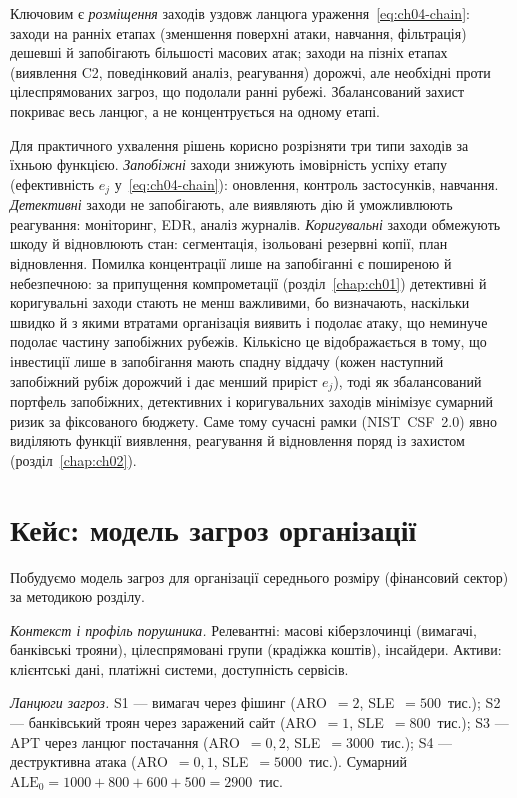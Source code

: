 Ключовим є \emph{розміщення} заходів уздовж ланцюга ураження~\eqref{eq:ch04-chain}: заходи на ранніх етапах (зменшення поверхні атаки, навчання, фільтрація) дешевші й запобігають більшості масових атак; заходи на пізніх етапах (виявлення C2, поведінковий аналіз, реагування) дорожчі, але необхідні проти цілеспрямованих загроз, що подолали ранні рубежі. Збалансований захист покриває весь ланцюг, а не концентрується на одному етапі.

Для практичного ухвалення рішень корисно розрізняти три типи заходів за їхньою функцією. \emph{Запобіжні} заходи знижують імовірність успіху етапу (ефективність $e_j$ у~\eqref{eq:ch04-chain}): оновлення, контроль застосунків, навчання. \emph{Детективні} заходи не запобігають, але виявляють дію й уможливлюють реагування: моніторинг, EDR, аналіз журналів. \emph{Коригувальні} заходи обмежують шкоду й відновлюють стан: сегментація, ізольовані резервні копії, план відновлення. Помилка концентрації лише на запобіганні є поширеною й небезпечною: за припущення компрометації (розділ~\ref{chap:ch01}) детективні й коригувальні заходи стають не менш важливими, бо визначають, наскільки швидко й з якими втратами організація виявить і подолає атаку, що неминуче подолає частину запобіжних рубежів. Кількісно це відображається в тому, що інвестиції лише в запобігання мають спадну віддачу (кожен наступний запобіжний рубіж дорожчий і дає менший приріст $e_j$), тоді як збалансований портфель запобіжних, детективних і коригувальних заходів мінімізує сумарний ризик за фіксованого бюджету. Саме тому сучасні рамки (NIST~CSF~2.0) явно виділяють функції виявлення, реагування й відновлення поряд із захистом (розділ~\ref{chap:ch02}).

\section{Кейс: модель загроз організації}\label{sec:ch04-case}

Побудуємо модель загроз для організації середнього розміру (фінансовий сектор) за методикою розділу.

\emph{Контекст і профіль порушника.} Релевантні: масові кіберзлочинці (вимагачі, банківські трояни), цілеспрямовані групи (крадіжка коштів), інсайдери. Активи: клієнтські дані, платіжні системи, доступність сервісів.

\emph{Ланцюги загроз.} S1 --- вимагач через фішинг (ARO~$=2$, SLE~$=500$~тис.); S2 --- банківський троян через заражений сайт (ARO~$=1$, SLE~$=800$~тис.); S3 --- APT через ланцюг постачання (ARO~$=0{,}2$, SLE~$=3000$~тис.); S4 --- деструктивна атака (ARO~$=0{,}1$, SLE~$=5000$~тис.). Сумарний $\mathrm{ALE}_0 = 1000+800+600+500 = 2900$~тис.

